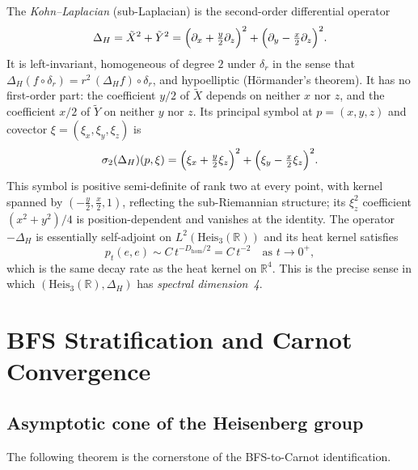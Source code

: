 \documentclass[11pt,a4paper]{article}
\theoremstyle{definition}
\theoremstyle{remark}
\newcommand{\HeisR}{\mathrm{Heis}_3(\mathbb{R})}
\newcommand{\DeltaH}{\Delta_H}
\newcommand{\Dhom}{D_{\mathrm{hom}}}
\begin{document}
    The \emph{Kohn--Laplacian} (sub-Laplacian) is the second-order differential operator
    \begin{equation}
      \DeltaH = \tilde X^2 + \tilde Y^2
      = \Bigl(\partial_x + \tfrac{y}{2}\partial_z\Bigr)^2 +
      \Bigl(\partial_y - \tfrac{x}{2}\partial_z\Bigr)^2.
      \label{eq:sublaplacian}
    \end{equation}
    It is left-invariant, homogeneous of degree $2$ under $\delta_r$ in the sense that
    $\DeltaH(f\circ\delta_r) = r^2\,(\DeltaH f)\circ\delta_r$, and hypoelliptic (H\"{o}rmander's theorem).
    It has no first-order part: the coefficient $y/2$ of $\tilde X$ depends on neither $x$ nor $z$, and the
    coefficient $x/2$ of $\tilde Y$ on neither $y$ nor $z$.
    Its principal symbol at $p = (x,y,z)$ and covector $\xi = (\xi_x, \xi_y, \xi_z)$ is
    \begin{equation}
      \sigma_2(\DeltaH)(p,\xi)
      = \Bigl(\xi_x + \tfrac{y}{2}\xi_z\Bigr)^2 + \Bigl(\xi_y - \tfrac{x}{2}\xi_z\Bigr)^2.
      \label{eq:symbol-sublaplacian}
    \end{equation}
    This symbol is positive semi-definite of rank two at every point, with kernel spanned by
    $(-\tfrac{y}{2}, \tfrac{x}{2}, 1)$, reflecting the sub-Riemannian structure; its $\xi_z^2$ coefficient
    $(x^2+y^2)/4$ is position-dependent and vanishes at the identity.
    The operator $-\DeltaH$ is essentially self-adjoint on $L^2(\HeisR)$ and its heat kernel
    satisfies
    \begin{equation}
      p_t(e,e) \sim C\,t^{-\Dhom/2} = C\,t^{-2} \quad \text{as } t \to 0^+,
    \end{equation}
    which is the same decay rate as the heat kernel on $\mathbb{R}^4$.
    This is the precise sense in which $(\HeisR, \DeltaH)$ has \emph{spectral dimension~4}.

  \section{BFS Stratification and Carnot Convergence}
  \label{sec:carnot}

  \subsection{Asymptotic cone of the Heisenberg group}

    The following theorem is the cornerstone of the BFS-to-Carnot identification.
\end{document}
